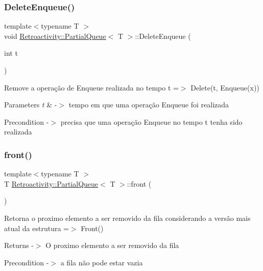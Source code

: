 \subsubsection{\texorpdfstring{Delete\+Enqueue()}{DeleteEnqueue()}}
{\footnotesize\ttfamily template$<$typename T $>$ \\
void \hyperlink{classRetroactivity_1_1PartialQueue}{Retroactivity\+::\+Partial\+Queue}$<$ T $>$\+::Delete\+Enqueue (\begin{DoxyParamCaption}\item[{int}]{t }\end{DoxyParamCaption})}

Remove a operação de Enqueue realizada no tempo t =$>$ Delete(t, Enqueue(x))


\begin{DoxyParams}{Parameters}
{\em t} & -\/$>$ tempo em que uma operação Enqueue foi realizada \\
\hline
\end{DoxyParams}
\begin{DoxyPrecond}{Precondition}
-\/$>$ precisa que uma operação Enqueue no tempo t tenha sido realizada 
\end{DoxyPrecond}
\mbox{\label{classRetroactivity_1_1PartialQueue_a54a86b012bd72869e2635c6b02ca71f9}} 
\subsubsection{\texorpdfstring{front()}{front()}}
{\footnotesize\ttfamily template$<$typename T $>$ \\
T \hyperlink{classRetroactivity_1_1PartialQueue}{Retroactivity\+::\+Partial\+Queue}$<$ T $>$\+::front (\begin{DoxyParamCaption}{ }\end{DoxyParamCaption})}

Retorna o proximo elemento a ser removido da fila considerando a versão mais atual da estrutura =$>$ Front()

\begin{DoxyReturn}{Returns}
-\/$>$ O proximo elemento a ser removido da fila 
\end{DoxyReturn}
\begin{DoxyPrecond}{Precondition}
-\/$>$ a fila não pode estar vazia 
\end{DoxyPrecond}
\mbox{\label{classRetroactivity_1_1PartialQueue_a5ad20b8de3b387557e9dfa67088353a8}} 
